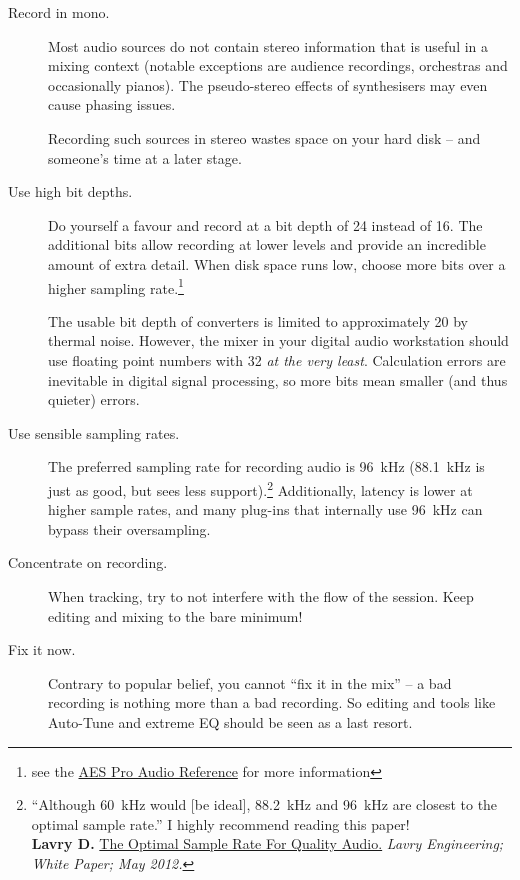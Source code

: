 \begin{description}
\item[Record in mono.]  Most audio sources do not contain stereo
  information that is useful in a mixing context (notable exceptions
  are audience recordings, orchestras and occasionally pianos).  The
  pseudo-stereo effects of synthesisers may even cause phasing issues.

  Recording such sources in stereo wastes space on your hard disk --
  and someone's time at a later stage.

\item[Use high bit depths.]  Do yourself a favour and record at a bit
  depth of \SI{24}{\bits} instead of \SI{16}{\bits}.  The additional
  bits allow recording at lower levels and provide an incredible
  amount of extra detail.  When disk space runs low, choose more bits
  over a higher sampling rate.\footnote{see the
    \href{http://www.aes.org/par/d/\#data_converter_bits}{AES Pro
      Audio Reference} for more information}

  The usable bit depth of converters is limited to approximately
  \SI{20}{\bits} by thermal noise.  However, the mixer in your digital
  audio workstation should use floating point numbers with
  \SI{32}{\bits} \emph{at the very least}.  Calculation errors are
  inevitable in digital signal processing, so more bits mean smaller
  (and thus quieter) errors.

\item[Use sensible sampling rates.]  The preferred sampling rate for
  recording audio is \SI{96}{\kilo\hertz} (\SI{88.1}{\kilo\hertz} is
  just as good, but sees less support).\footnote{``Although
    \SI{60}{\kilo\hertz} would [be ideal], \SI{88.2}{\kilo\hertz} and
    \SI{96}{\kilo\hertz} are closest to the optimal sample rate.''  I
    highly recommend
    reading this paper! \\
    \textbf{Lavry D.}
    \href{http://www.lavryengineering.com/lavry-white-papers/}{The
      Optimal Sample Rate For Quality Audio.} \emph{Lavry Engineering;
      White Paper; May 2012.}}  Additionally, latency is lower at
  higher sample rates, and many plug-ins that internally use
  \SI{96}{\kilo\hertz} can bypass their oversampling.

\item[Concentrate on recording.]  When tracking, try to not interfere
  with the flow of the session.  Keep editing and mixing to the bare
  minimum!

\item[Fix it now.]  Contrary to popular belief, you cannot ``fix it in
  the mix'' -- a bad recording is nothing more than a bad recording.
  So editing and tools like Auto-Tune and extreme EQ should be seen as
  a last resort.


\end{description}

